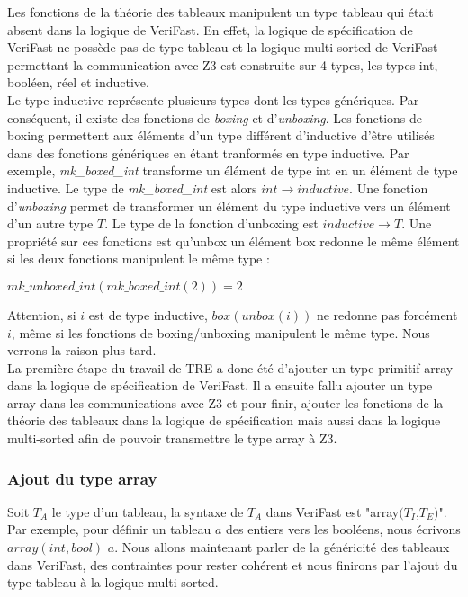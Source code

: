\documentclass[11pt,openany]{article}
\newcommand{\verifast}{VeriFast}
\begin{document}
	Les fonctions de la th\'eorie des tableaux manipulent un type tableau qui \'etait absent dans la logique de \verifast{}. En effet, la logique de sp\'ecification de \verifast{} ne poss\`ede pas de type tableau et la logique multi-sorted de \verifast{} permettant la communication avec Z3 est construite sur 4 types, les types int, bool\'een, r\'eel et inductive.\\
	Le type inductive repr\'esente plusieurs types dont les types g\'en\'eriques. Par cons\'equent, il existe des fonctions de \textit{boxing} et d'\textit{unboxing}. Les fonctions de boxing permettent aux \'el\'ements d'un type diff\'erent d'inductive d'\^etre utilis\'es dans des fonctions g\'en\'eriques en \'etant tranform\'es en type inductive. Par exemple, \textit{mk_boxed_int} transforme un \'el\'ement de type int en un \'el\'ement de type inductive. Le type de \textit{mk_boxed_int} est alors $int \rightarrow inductive$. Une fonction d'\textit{unboxing} permet de transformer un \'el\'ement du type inductive vers un \'el\'ement d'un autre type $T$. Le type de la fonction d'unboxing est $inductive \rightarrow T$. Une propri\'et\'e sur ces fonctions est qu'unbox un \'el\'ement box redonne le m\^eme \'el\'ement si les deux fonctions manipulent le m\^eme type :
	\begin{center}
		$mk\_unboxed\_int(mk\_boxed\_int(2)) = 2$
	\end{center}
	Attention, si $i$ est de type inductive, $box(unbox(i))$ ne redonne pas forc\'ement $i$, m\^eme si les fonctions de boxing/unboxing manipulent le m\^eme type. Nous verrons la raison plus tard.\\ 
	La premi\`ere \'etape du travail de TRE a donc \'et\'e d'ajouter un type primitif array dans la logique de sp\'ecification de \verifast{}. Il a ensuite fallu ajouter un type array dans les communications avec Z3 et pour finir, ajouter les fonctions de la th\'eorie des tableaux dans la logique de sp\'ecification mais aussi dans la logique multi-sorted afin de pouvoir transmettre le type array \`a Z3.
		\subsubsection{Ajout du type array}
		Soit $T_{A}$ le type d'un tableau, la syntaxe de $T_{A}$ dans \verifast{} est "array$(T_I$,$T_E)$". Par exemple, pour d\'efinir un tableau $a$ des entiers vers les bool\'eens, nous \'ecrivons $array(int,bool)$ $a$. Nous allons maintenant parler de la g\'en\'ericit\'e des tableaux dans \verifast{}, des contraintes pour rester coh\'erent et nous finirons par l'ajout du type tableau \`a la logique multi-sorted.
\end{document}
